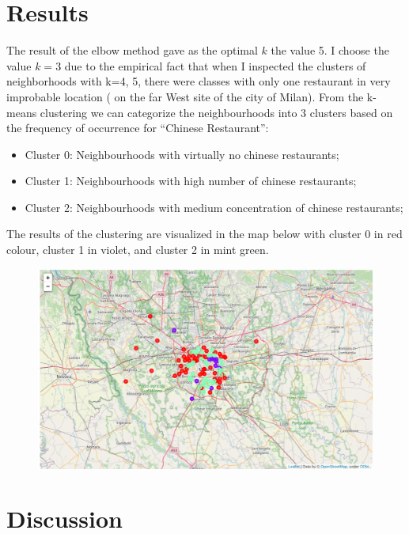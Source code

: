 \documentclass[12pt]{article} %
\begin{document}
\newpage

\section{Results}

The result of the elbow method gave as the optimal $k$ the value 5. I choose the value $k=3$ due to the empirical fact that when I inspected the clusters of neighborhoods with k={4, 5}, there were classes with only one restaurant in very improbable location ( on the far West site of the city of Milan).
From the k-means clustering we can categorize the neighbourhoods into 3 clusters based on the frequency of occurrence for “Chinese Restaurant”:

\begin{itemize}
	\item Cluster 0: Neighbourhoods with virtually no chinese restaurants;
	\item Cluster 1: Neighbourhoods with high number of chinese restaurants;
	\item Cluster 2: Neighbourhoods with medium concentration of chinese restaurants;
\end{itemize}

The results of the clustering are visualized in the map below with cluster 0 in red colour, cluster 1 in violet, and cluster 2 in mint green.

\begin{figure}[h]
\includegraphics[width=\textwidth]{Milan_clustered}
\label{your_label}
\end{figure}




\section{Discussion}
\end{document}
